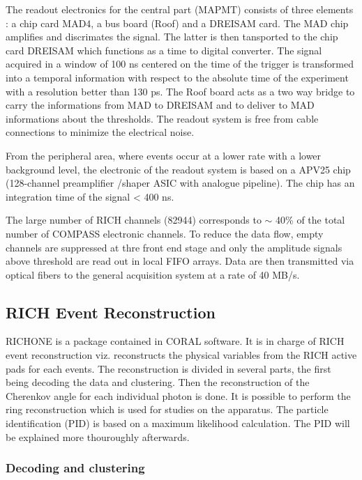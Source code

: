 The readout electronics for the central part (MAPMT) consists of three elements : a chip card MAD4, a bus board (Roof) and a DREISAM card. The MAD chip amplifies
and discrimates the signal. The latter is then tansported to the chip card DREISAM which functions as a time to digital converter. The signal acquired in a window
of 100 ns centered on the time of the trigger is transformed into a temporal information with respect to the absolute time of the experiment with a resolution better
than 130 ps. The Roof board acts as a two way bridge to carry the informations from MAD to DREISAM and to deliver to MAD informations about the thresholds. The readout
system is free from cable connections to minimize the electrical noise.

From the peripheral area, where events occur at a lower rate with a lower background level, the electronic of the readout system is based on a APV25 chip (128-channel
preamplifier /shaper ASIC with analogue pipeline)\cite{}. The chip has an integration time of the signal < 400 ns.

The large number of RICH channels (82944) corresponds to $\sim$ 40\% of the total number of COMPASS electronic channels. To reduce the data flow, empty channels are
suppressed at thre front end stage and only the amplitude signals above threshold are read out in local FIFO arrays. Data are then transmitted via optical fibers
to the general acquisition system at a rate of 40 MB/s.

\subsection*{RICH Event Reconstruction}

RICHONE is a package contained in CORAL software. It is in charge of RICH event reconstruction viz. reconstructs the physical variables from the RICH active pads for each
events. The reconstruction is divided in several parts, the first being decoding the data and clustering. Then the reconstruction of the Cherenkov angle for each individual
photon is done. It is possible to perform the ring reconstruction which is used for studies on the apparatus. The particle identification (PID) is based on a maximum
likelihood calculation. The PID will be explained more thouroughly afterwards.

\subsubsection*{Decoding and clustering}

